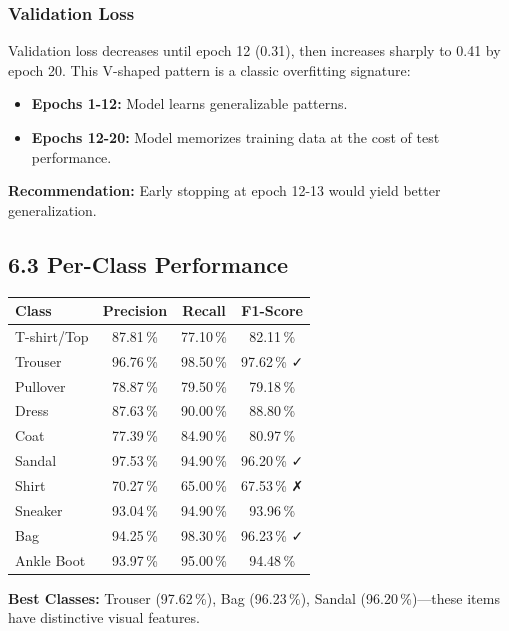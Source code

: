 \documentclass[11pt]{article}
\begin{document}
\subsubsection*{Validation Loss}
Validation loss decreases until epoch 12 (0.31), then increases sharply to 0.41 by epoch 20. This V-shaped pattern is a classic overfitting signature:
\begin{itemize}
\item \textbf{Epochs 1-12:} Model learns generalizable patterns.
\item \textbf{Epochs 12-20:} Model memorizes training data at the cost of test performance.
\end{itemize}

\textbf{Recommendation:} Early stopping at epoch 12-13 would yield better generalization.

\subsection*{6.3 Per-Class Performance}

\begin{center}
\begin{tabular}{|l|c|c|c|}
\hline
\textbf{Class} & \textbf{Precision} & \textbf{Recall} & \textbf{F1-Score}\\
\hline
T-shirt/Top & 87.81\,\% & 77.10\,\% & 82.11\,\%\\
\hline
Trouser & 96.76\,\% & 98.50\,\% & 97.62\,\% ✓\\
\hline
Pullover & 78.87\,\% & 79.50\,\% & 79.18\,\%\\
\hline
Dress & 87.63\,\% & 90.00\,\% & 88.80\,\%\\
\hline
Coat & 77.39\,\% & 84.90\,\% & 80.97\,\%\\
\hline
Sandal & 97.53\,\% & 94.90\,\% & 96.20\,\% ✓\\
\hline
Shirt & 70.27\,\% & 65.00\,\% & 67.53\,\% ✗\\
\hline
Sneaker & 93.04\,\% & 94.90\,\% & 93.96\,\%\\
\hline
Bag & 94.25\,\% & 98.30\,\% & 96.23\,\% ✓\\
\hline
Ankle Boot & 93.97\,\% & 95.00\,\% & 94.48\,\%\\
\hline
\end{tabular}
\end{center}

\textbf{Best Classes:} Trouser (97.62\,\%), Bag (96.23\,\%), Sandal (96.20\,\%)—these items have distinctive visual features.
\end{document}
